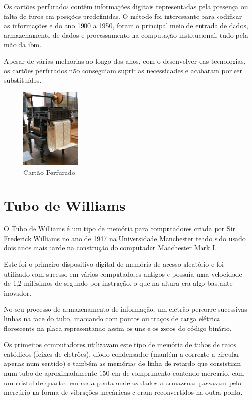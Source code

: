 \documentclass{report}
\begin{document}
		Os cartões perfurados contêm informações digitais representadas pela presença ou falta de furos em posições predefinidas. O método foi interessante para codificar as informações e do ano 1900 a 1950, foram o principal meio de entrada de dados, armazenamento de dados e processamento na computação institucional, tudo pela mão da \ac{ibm}. 
		
		Apesar de várias melhorias ao longo dos anos, com o desenvolver das tecnologias, os cartões perfurados não conseguiam suprir as necessidades e acabaram por ser substituídos.
		
		\begin{figure}[h]
		\centering
		\includegraphics[width=3cm, height=4cm]{cartaoperfurado.jpg}
		\caption{Cartão Perfurado}
		\end{figure}
\newpage

		\section{Tubo de Williams}
		O Tubo de Williams é um tipo de memória para computadores criada por Sir Frederick Williams no ano de 1947 na Universidade Manchester tendo sido usado dois anos mais tarde na construção do computador Manchester Mark I.
	
	Este foi o primeiro dispositivo digital de memória de acesso aleatório e foi utilizado com sucesso em vários computadores antigos e possuía uma velocidade de 1,2 milésimos de segundo por instrução, o que na altura era algo bastante inovador.
	
	No seu processo de armazenamento de informação, um eletrão percorre sucessivas linhas na face do tubo, marcando com pontos ou traços de carga elétrica florescente na placa representando assim os uns e os zeros do código binário.
	
	Os primeiros computadores utilizavam este tipo de memória de tubos de raios catódicos (feixes de eletrões), díodo-condensador (mantém a corrente a circular apenas num sentido) e também as memórias de linha de retardo que consistiam num tubo de aproximadamente 150 cm de comprimento contendo mercúrio, com um cristal de quartzo em cada ponta onde os dados a armazenar passavam pelo mercúrio na forma de vibrações mecânicas e eram reconvertidos na outra ponta.
\vspace{10mm}
\end{document}
